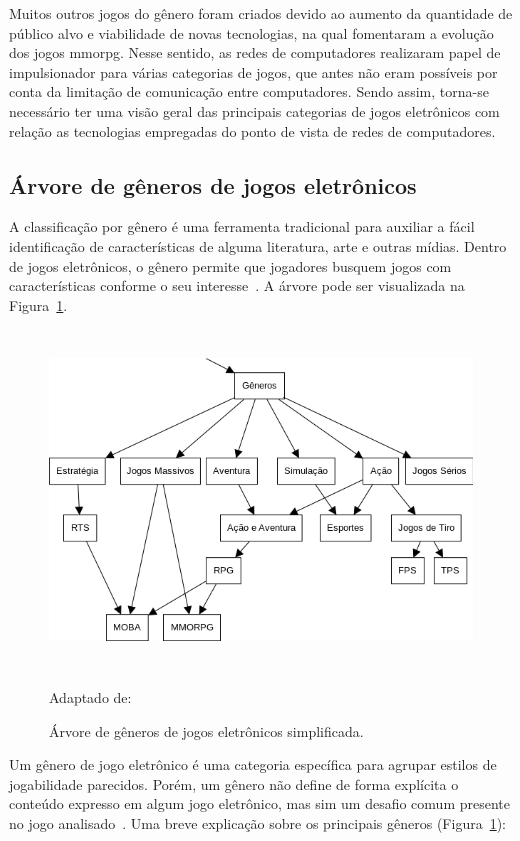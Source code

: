 Muitos outros jogos do gênero foram criados devido ao aumento da quantidade de público alvo e viabilidade de novas tecnologias, na qual fomentaram a evolução dos jogos \ac{mmorpg}.
%
Nesse sentido, as redes de computadores realizaram papel de impulsionador para várias categorias de jogos, que antes não eram possíveis por conta da limitação de comunicação entre computadores.
%
Sendo assim, torna-se necessário ter uma visão geral das principais categorias de jogos eletrônicos com relação as tecnologias empregadas do ponto de vista de redes de computadores.



\subsection{Árvore de gêneros de jogos eletrônicos}
\label{sec:arvore_generos}


A classificação por gênero é uma ferramenta tradicional para auxiliar a fácil identificação de características de alguma literatura, arte e outras mídias.
%
Dentro de jogos eletrônicos, o gênero permite que jogadores busquem jogos com características conforme o seu interesse~\cite{Clarke2015}.
%
A árvore pode ser visualizada na Figura~\ref{fig:generos}.


\begin{figure}[htb!]
\caption{Árvore de gêneros de jogos eletrônicos simplificada.}
\label{fig:generos}
\includegraphics[height=9cm]{img/cap2/generos.png}
\centering

Adaptado de:~\cite{adams_1208533}
\end{figure}



Um gênero de jogo eletrônico é uma categoria específica para agrupar estilos de jogabilidade parecidos.
%
Porém, um gênero não define de forma explícita o conteúdo expresso em algum jogo eletrônico, mas sim um desafio comum presente no jogo analisado~\cite{adams_1208533, video_game_technologies}.
%
Uma breve explicação sobre os principais gêneros (Figura~\ref{fig:generos}):



